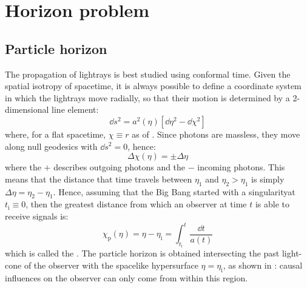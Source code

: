 
\section{Horizon problem}

\subsection{Particle horizon}

The propagation of lightrays is best studied using conformal time. Given the spatial isotropy of spacetime, it is always possible to define a coordinate system in which the lightrays move radially, so that their motion is determined by a 2-dimensional line element:
\begin{equation*}
  \dd s^2 = a^2(\eta) \left[ \dd \eta^2 - \dd \chi^2 \right]
\end{equation*}
where, for a flat spacetime, $ \chi \equiv r $ as of . Since photons are massless, they move along null geodesics with $ \dd s^2 = 0 $, hence:
\begin{equation*}
  \Delta \chi (\eta) = \pm \Delta \eta
\end{equation*}
where the $ + $ describes outgoing photons and the $ - $ incoming photons. This means that the distance that time travels between $ \eta_1 $ and $ \eta_2 > \eta_1 $ is simply $ \Delta \eta = \eta_2 - \eta_1 $. Hence, assuming that the Big Bang started with a singularity\footnotemark at $ t_\text{i} \equiv 0 $, then the greatest distance from which an observer at time $ t $ is able to receive signals is:
\begin{equation}
  \chi_\text{p}(\eta) = \eta - \eta_\text{i} = \int_{t_\text{i}}^t \frac{\dd t}{a(t)}
\end{equation}
which is called the . The particle horizon is obtained intersecting the past light-cone of the observer with the spacelike hypersurface $ \eta = \eta_\text{i} $, as shown in : causal influences on the observer can only come from within this region.



